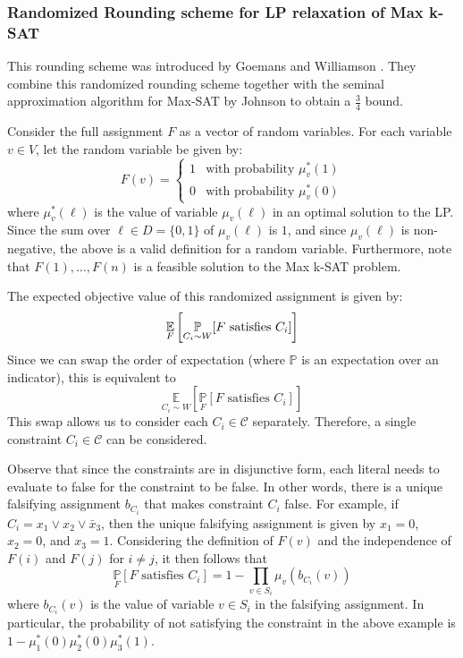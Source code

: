 \subsubsection{Randomized Rounding scheme for LP relaxation of Max k-SAT}\label{sec:lpRoundingSat}
This rounding scheme was introduced by Goemans and Williamson \cite{GoeWil94}. They combine this randomized rounding scheme together with the seminal approximation algorithm for Max-SAT by Johnson \cite{Joh73} to obtain a $\frac{3}{4}$ bound.
 
Consider the full assignment $F$ as a vector of random variables. For each variable $v \in V$, let the random variable be given by:
\[
	F(v) = \begin{cases}
	1 & \text{with probability } \mu^*_v(1)\\
	0 & \text{with probability } \mu^*_v(0)
	\end{cases}
\]
where $\mu^*_v(\ell)$ is the value of variable $\mu_v(\ell)$ in an optimal solution to the LP.
Since the sum over $\ell \in D = \{0,1\}$ of  $\mu_v(\ell)$ is $1$, and since $\mu_v(\ell)$ is non-negative, the above is a valid definition for a random variable. 
Furthermore, note that $F(1), \dots, F(n)$ is a feasible solution to the Max k-SAT problem.

The expected objective value of this randomized assignment is given by:
\[
	\underset{F}{\mathbb{E}}\left[ \underset{C_i \sim W}{\mathbb{P}}[ F \text{ satisfies } C_i] \right]
\]
Since we can swap the order of expectation (where $\mathbb{P}$ is an expectation over an indicator), this is equivalent to
\[
\underset{C_i \sim W}{\mathbb{E}}\left[ \underset{F}{\mathbb{P}}[ F \text{ satisfies } C_i] \right]
\]
This swap allows us to consider each $C_i \in \mathcal{C}$ separately. 
Therefore, a single constraint $C_i \in \mathcal{C}$ can be considered.

Observe that since the constraints are in disjunctive form, each literal needs to evaluate to false for the constraint to be false. 
In other words, there is a unique falsifying assignment $b_{C_i}$ that makes constraint $C_i$ false. 
For example, if $C_i = x_1 \vee x_2 \vee \bar{x}_3$, then the unique falsifying assignment is given by $x_1 = 0$, $x_2 = 0$, and $x_3 = 1$. 
Considering the definition of $F(v)$ and the independence of $F(i)$ and $F(j)$ for $i \neq j$, it then follows that 
\begin{equation}
		\underset{F}{\mathbb{P}}[ F \text{ satisfies } C_i] = 1 - \prod_{v \in S_i} \mu_v(b_{C_i}(v)) \label{eq:objectiveRounding}
\end{equation}
where $b_{C_i}(v)$ is the value of variable $v \in S_i$ in the falsifying assignment. 
In particular, the probability of not satisfying the constraint in the above example is $ 1- \mu_1^*(0) \mu_2^*(0) \mu_3^*(1)$.

